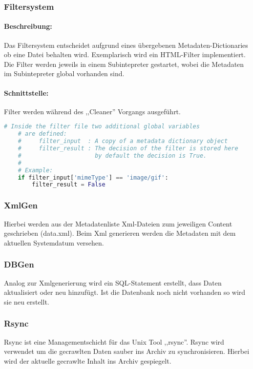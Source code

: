 \subsubsection{Filtersystem}
\label{ssub:filtersystem}
\paragraph{Beschreibung:}
\label{par:beschreibung_}
Das Filtersystem entscheidet aufgrund eines übergebenen Metadaten-Dictionaries ob eine Datei behalten wird. Exemplarisch wird ein HTML-Filter
implementiert. Die Filter werden jeweils in einem Subintepreter gestartet, wobei die Metadaten im Subintepreter global vorhanden sind.

\paragraph{Schnittstelle:}
\label{par:schnittstelle_}
Filter werden während des ,,Cleaner'' Vorgangs ausgeführt.
\begin{lstlisting}[language=python]
    # Inside the filter file two additional global variables
    # are defined:
    #     filter_input  : A copy of a metadata dictionary object
    #     filter_result : The decision of the filter is stored here
    #                     by default the decision is True.
    #
    # Example:
    if filter_input['mimeType'] == 'image/gif':
        filter_result = False
\end{lstlisting}


\subsubsection{XmlGen}
\label{ssub:xmlgen}
Hierbei werden aus der Metadatenliste Xml-Dateien zum jeweiligen Content geschrieben (data.xml). 
Beim Xml generieren werden die Metadaten mit dem aktuellen Systemdatum versehen.


\subsubsection{DBGen}
\label{ssub:dbgen}
Analog zur Xmlgenerierung wird ein SQL-Statement erstellt, dass Daten aktualisiert oder neu hinzufügt.
Ist die Datenbank noch nicht vorhanden so wird sie neu erstellt.


\subsubsection{Rsync}
\label{ssub:rsync}
Rsync ist eine Managementschicht für das Unix Tool ,,rsync''. Rsync wird verwendet um die gecrawlten Daten sauber ins Archiv zu synchronisieren.
Hierbei wird der aktuelle gecrawlte Inhalt ins Archiv gespiegelt. 


